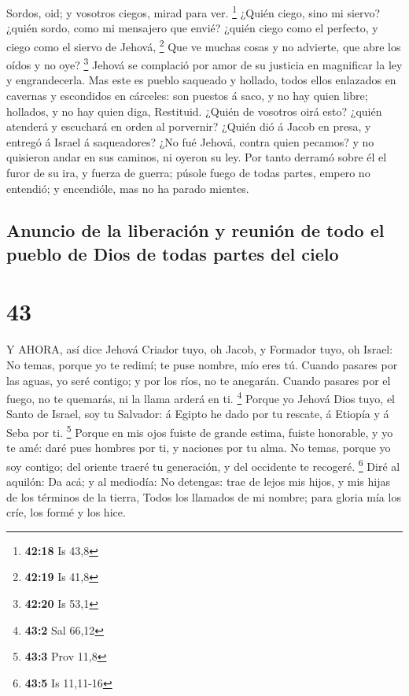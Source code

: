  Sordos, oid; y vosotros ciegos, mirad para ver.
\footnote{\textbf{42:18} Is 43,8}  ¿Quién ciego, sino mi
siervo? ¿quién sordo, como mi mensajero que envié? ¿quién ciego como el
perfecto, y ciego como el siervo de Jehová, \footnote{\textbf{42:19} Is
  41,8}  Que ve muchas cosas y no advierte, que abre los
oídos y no oye? \footnote{\textbf{42:20} Is 53,1}  Jehová
se complació por amor de su justicia en magnificar la ley y
engrandecerla.  Mas este es pueblo saqueado y hollado,
todos ellos enlazados en cavernas y escondidos en cárceles: son puestos
á saco, y no hay quien libre; hollados, y no hay quien diga, Restituid.
 ¿Quién de vosotros oirá esto? ¿quién atenderá y escuchará
en orden al porvernir?  ¿Quién dió á Jacob en presa, y
entregó á Israel á saqueadores? ¿No fué Jehová, contra quien pecamos? y
no quisieron andar en sus caminos, ni oyeron su ley.  Por
tanto derramó sobre él el furor de su ira, y fuerza de guerra; púsole
fuego de todas partes, empero no entendió; y encendióle, mas no ha
parado mientes.

\hypertarget{anuncio-de-la-liberaciuxf3n-y-reuniuxf3n-de-todo-el-pueblo-de-dios-de-todas-partes-del-cielo}{%
\subsection{Anuncio de la liberación y reunión de todo el pueblo de Dios
de todas partes del
cielo}\label{anuncio-de-la-liberaciuxf3n-y-reuniuxf3n-de-todo-el-pueblo-de-dios-de-todas-partes-del-cielo}}

\hypertarget{section-42}{%
\section{43}\label{section-42}}

 Y AHORA, así dice Jehová Criador tuyo, oh Jacob, y Formador
tuyo, oh Israel: No temas, porque yo te redimí; te puse nombre, mío eres
tú.  Cuando pasares por las aguas, yo seré contigo; y por
los ríos, no te anegarán. Cuando pasares por el fuego, no te quemarás,
ni la llama arderá en ti. \footnote{\textbf{43:2} Sal 66,12}
 Porque yo Jehová Dios tuyo, el Santo de Israel, soy tu
Salvador: á Egipto he dado por tu rescate, á Etiopía y á Seba por ti.
\footnote{\textbf{43:3} Prov 11,8}  Porque en mis ojos
fuiste de grande estima, fuiste honorable, y yo te amé: daré pues
hombres por ti, y naciones por tu alma.  No temas, porque yo
soy contigo; del oriente traeré tu generación, y del occidente te
recogeré. \footnote{\textbf{43:5} Is 11,11-16}  Diré al
aquilón: Da acá; y al mediodía: No detengas: trae de lejos mis hijos, y
mis hijas de los términos de la tierra,  Todos los llamados
de mi nombre; para gloria mía los críe, los formé y los hice.

